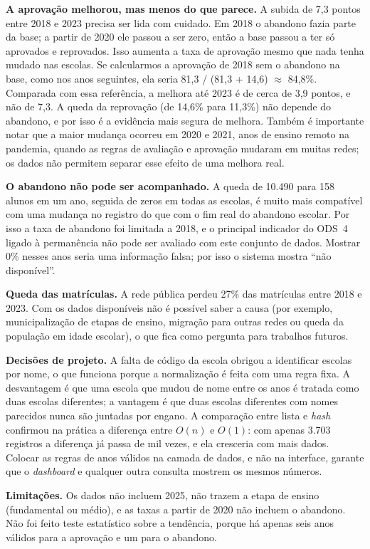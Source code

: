 \documentclass[preprint,10pt,5p]{elsarticle}
\begin{document}
\textbf{A aprovação melhorou, mas menos do que parece.} A subida de 7,3 pontos entre 2018 e 2023 precisa ser lida com cuidado. Em 2018 o abandono fazia parte da base; a partir de 2020 ele passou a ser zero, então a base passou a ter só aprovados e reprovados. Isso aumenta a taxa de aprovação mesmo que nada tenha mudado nas escolas. Se calcularmos a aprovação de 2018 sem o abandono na base, como nos anos seguintes, ela seria 81,3 / (81,3 + 14,6) $\approx$ 84,8\%. Comparada com essa referência, a melhora até 2023 é de cerca de 3,9 pontos, e não de 7,3. A queda da reprovação (de 14,6\% para 11,3\%) não depende do abandono, e por isso é a evidência mais segura de melhora. Também é importante notar que a maior mudança ocorreu em 2020 e 2021, anos de ensino remoto na pandemia, quando as regras de avaliação e aprovação mudaram em muitas redes; os dados não permitem separar esse efeito de uma melhora real.

\textbf{O abandono não pode ser acompanhado.} A queda de 10.490 para 158 alunos em um ano, seguida de zeros em todas as escolas, é muito mais compatível com uma mudança no registro do que com o fim real do abandono escolar. Por isso a taxa de abandono foi limitada a 2018, e o principal indicador do ODS~4 ligado à permanência não pode ser avaliado com este conjunto de dados. Mostrar 0\% nesses anos seria uma informação falsa; por isso o sistema mostra ``não disponível''.

\textbf{Queda das matrículas.} A rede pública perdeu 27\% das matrículas entre 2018 e 2023. Com os dados disponíveis não é possível saber a causa (por exemplo, municipalização de etapas de ensino, migração para outras redes ou queda da população em idade escolar), o que fica como pergunta para trabalhos futuros.

\textbf{Decisões de projeto.} A falta de código da escola obrigou a identificar escolas por nome, o que funciona porque a normalização é feita com uma regra fixa. A desvantagem é que uma escola que mudou de nome entre os anos é tratada como duas escolas diferentes; a vantagem é que duas escolas diferentes com nomes parecidos nunca são juntadas por engano. A comparação entre lista e \textit{hash} confirmou na prática a diferença entre $O(n)$ e $O(1)$: com apenas 3.703 registros a diferença já passa de mil vezes, e ela cresceria com mais dados. Colocar as regras de anos válidos na camada de dados, e não na interface, garante que o \textit{dashboard} e qualquer outra consulta mostrem os mesmos números.

\textbf{Limitações.} Os dados não incluem 2025, não trazem a etapa de ensino (fundamental ou médio), e as taxas a partir de 2020 não incluem o abandono. Não foi feito teste estatístico sobre a tendência, porque há apenas seis anos válidos para a aprovação e um para o abandono.
\end{document}
